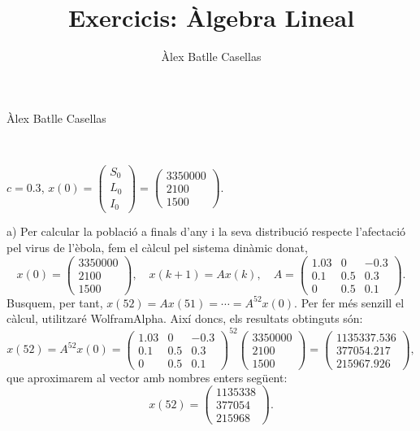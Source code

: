 \documentclass[11pt]{article}
\title{Exercicis: Àlgebra Lineal}
\author{Àlex Batlle Casellas}
\begin{document}
\begin{small}
Àlex Batlle Casellas
\end{small}\\

\begin{legal}
	\item $c=0.3$, $x(0)=\begin{pmatrix}S_0\\ L_0\\ I_0\end{pmatrix}=\begin{pmatrix}3350000\\ 2100\\ 1500\end{pmatrix}$.\\
	\begin{legal}
	\item[a)] Per calcular la població a finals d'any i la seva distribució respecte l'afectació pel virus de l'èbola, fem el càlcul pel sistema dinàmic donat,
	$$
	x(0)=\begin{pmatrix}3350000\\ 2100\\ 1500\end{pmatrix},
	\quad x(k+1)=Ax(k),
	\quad A=\begin{pmatrix}
	1.03 & 0 & -0.3\\
	0.1 & 0.5 & 0.3\\
	0 & 0.5 & 0.1
	\end{pmatrix}.
	$$
	Busquem, per tant, $x(52)=Ax(51)=\cdots=A^{52}x(0)$. Per fer més senzill el càlcul, utilitzaré WolframAlpha. Així doncs, els resultats obtinguts són:
	$$
	x(52)=A^{52}x(0)=\begin{pmatrix}
	1.03 & 0 & -0.3\\
	0.1 & 0.5 & 0.3\\
	0 & 0.5 & 0.1
	\end{pmatrix}^{52}
	\begin{pmatrix}3350000\\ 2100\\ 1500\end{pmatrix}=
	\begin{pmatrix}1135337.536\\ 377054.217\\ 215967.926\end{pmatrix},
	$$
	que aproximarem al vector amb nombres enters següent:
	$$
	x(52)=\begin{pmatrix}1135338\\ 377054\\ 215968\end{pmatrix}.
$$
\end{legal}
\end{legal}
\end{document}
